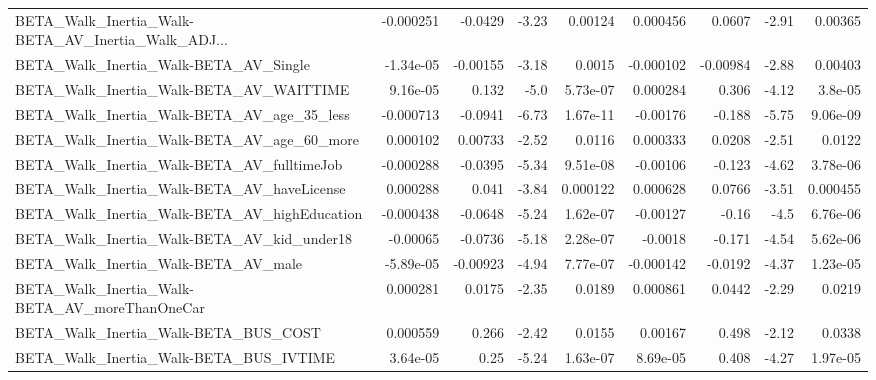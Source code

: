 \begin{tabular}{lrrrrrrrr}
BETA\_Walk\_Inertia\_Walk-BETA\_AV\_Inertia\_Walk\_ADJ... &   -0.000251 &      -0.0429 &    -3.23 &  0.00124 &   0.000456 &      0.0607 &        -2.91 &       0.00365 \\
BETA\_Walk\_Inertia\_Walk-BETA\_AV\_Single              &   -1.34e-05 &     -0.00155 &    -3.18 &   0.0015 &  -0.000102 &    -0.00984 &        -2.88 &       0.00403 \\
BETA\_Walk\_Inertia\_Walk-BETA\_AV\_WAITTIME            &    9.16e-05 &        0.132 &     -5.0 & 5.73e-07 &   0.000284 &       0.306 &        -4.12 &       3.8e-05 \\
BETA\_Walk\_Inertia\_Walk-BETA\_AV\_age\_35\_less         &   -0.000713 &      -0.0941 &    -6.73 & 1.67e-11 &   -0.00176 &      -0.188 &        -5.75 &      9.06e-09 \\
BETA\_Walk\_Inertia\_Walk-BETA\_AV\_age\_60\_more         &    0.000102 &      0.00733 &    -2.52 &   0.0116 &   0.000333 &      0.0208 &        -2.51 &        0.0122 \\
BETA\_Walk\_Inertia\_Walk-BETA\_AV\_fulltimeJob         &   -0.000288 &      -0.0395 &    -5.34 & 9.51e-08 &   -0.00106 &      -0.123 &        -4.62 &      3.78e-06 \\
BETA\_Walk\_Inertia\_Walk-BETA\_AV\_haveLicense         &    0.000288 &        0.041 &    -3.84 & 0.000122 &   0.000628 &      0.0766 &        -3.51 &      0.000455 \\
BETA\_Walk\_Inertia\_Walk-BETA\_AV\_highEducation       &   -0.000438 &      -0.0648 &    -5.24 & 1.62e-07 &   -0.00127 &       -0.16 &         -4.5 &      6.76e-06 \\
BETA\_Walk\_Inertia\_Walk-BETA\_AV\_kid\_under18         &    -0.00065 &      -0.0736 &    -5.18 & 2.28e-07 &    -0.0018 &      -0.171 &        -4.54 &      5.62e-06 \\
BETA\_Walk\_Inertia\_Walk-BETA\_AV\_male                &   -5.89e-05 &     -0.00923 &    -4.94 & 7.77e-07 &  -0.000142 &     -0.0192 &        -4.37 &      1.23e-05 \\
BETA\_Walk\_Inertia\_Walk-BETA\_AV\_moreThanOneCar      &    0.000281 &       0.0175 &    -2.35 &   0.0189 &   0.000861 &      0.0442 &        -2.29 &        0.0219 \\
BETA\_Walk\_Inertia\_Walk-BETA\_BUS\_COST               &    0.000559 &        0.266 &    -2.42 &   0.0155 &    0.00167 &       0.498 &        -2.12 &        0.0338 \\
BETA\_Walk\_Inertia\_Walk-BETA\_BUS\_IVTIME             &    3.64e-05 &         0.25 &    -5.24 & 1.63e-07 &   8.69e-05 &       0.408 &        -4.27 &      1.97e-05 \\

\end{tabular}
